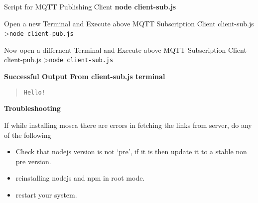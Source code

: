 \documentclass[16pt]{article}
\begin{document}
Script for MQTT Publishing Client \textbf{node client-sub.js}

 
 

Open a new Terminal and Execute above MQTT Subscription Client
client-sub.js \textgreater{}\texttt{node client-pub.js}

Now open a differnent Terminal and Execute above MQTT Subscription
Client client-pub.js \textgreater{}\texttt{node client-sub.js}

\textbf{Successful Output From client-sub.js terminal}

\begin{quote}
\texttt{Hello!}
\end{quote}

\vspace{0.5cm}

{\Large{\textbf{Troubleshooting}}}


If while installing mosca there are errors in fetching the links from
server, do any of the following 

\begin{itemize}

\item Check that nodejs version is not
`pre', if it is then update it to a stable non pre version.
\item reinstalling nodejs and npm in root mode. 
\item restart your system.

\end{itemize}
\end{document}
